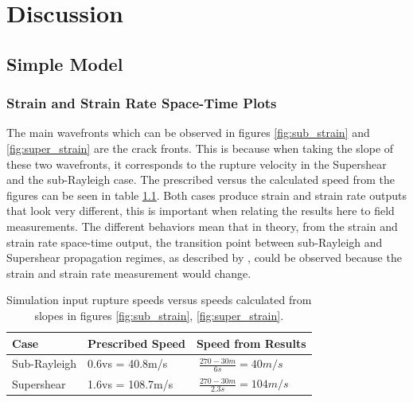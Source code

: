 \chapter{Discussion}
\label{chap:discussion}
%
%


\section{Simple Model}
\label{sec:simple_disc}

\subsection{Strain and Strain Rate Space-Time Plots}
The main wavefronts which can be observed in figures \ref{fig:sub_strain} and \ref{fig:super_strain} are the crack fronts. This is because when taking the slope of these two wavefronts, it corresponds to the rupture velocity in the Supershear and the sub-Rayleigh case. The prescribed versus the calculated speed from the figures can be seen in table \ref{tab:results_speeds}. Both cases produce strain and strain rate outputs that look very different, this is important when relating the results here to field measurements. The different behaviors mean that in theory, from the strain and strain rate space-time output, the transition point between sub-Rayleigh and Supershear propagation regimes, as described by \cite{trottetTransitionSubRayleighAnticrack2022,bergfeldSignaturesSubRayleighSupershear2025,sironTheoreticalFrameworkDynamic2023}, could be observed because the strain and strain rate measurement would change. \par

\begin{table}[H]
\begin{tabular}{|l|l|l|}
\hline
Case         & Prescribed Speed  & Speed from Results                 \\ \hline
Sub-Rayleigh & 0.6vs = 40.8m/s  & $ \ \frac{270-30m}{6s} = 40m/s$    \\ \hline
Supershear   & 1.6vs = 108.7m/s & $ \ \frac{270-30m}{2.3s} = 104m/s$ \\ \hline
\end{tabular}
\caption{Simulation input rupture speeds versus speeds calculated from slopes in figures \ref{fig:sub_strain}, \ref{fig:super_strain}.}
\label{tab:results_speeds}
\end{table}

